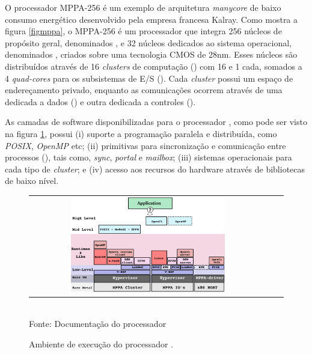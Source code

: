 \documentclass[
	12pt,				%
	openright,			%
	twoside,			%
	a4paper,			%
	english,			%
	brazil,				%
	]{abntex2}
\begin{document}
        O processador MPPA-256 é um exemplo de arquitetura \textit{manycore}
        de baixo consumo energético \cite{Castro-IA3:2013} desenvolvido pela
        empresa francesa Kalray. Como mostra a figura \ref{figmppa}, o MPPA-256
        é um processador que integra 256 núcleos de propósito geral,
        denominados \pe, e 32 núcleos dedicados ao sistema operacional,
        denominados \rman, criados sobre uma tecnologia CMOS de 28nm.
        Esses núcleos são distribuídos através de 16 \textit{clusters} de
        computação (\cpclusters) com 16 \pes e 1 \rman cada, somados a 
        4 \textit{quad-cores} para os subsistemas de E/S (\ioclusters).
        Cada \textit{cluster} possui um espaço de endereçamento privado,
        enquanto as comunicações ocorrem através de uma \noc dedicada a
        dados (\dnoc) e outra dedicada a controles (\cnoc).
            
        As camadas de software disponibilizadas para o processador \mppa,
        como pode ser visto na figura \ref{figruntime}, possui
        (i) suporte a programação paralela e distribuída, como
        \textit{POSIX}, \textit{OpenMP} etc;
        (ii) primitivas para sincronização e comunicação entre processos
        (\ipc), tais como, \textit{sync}, \textit{portal} e \textit{mailbox};
        (iii) sistemas operacionais para cada tipo de \textit{cluster}; e
        (iv) acesso aos recursos do hardware através de bibliotecas de baixo nível.
    
        \begin{figure}[t]
        	\begin{center}
            	\caption{Ambiente de execução do processador \mppa.}
                   \label{figruntime}
        		\begin{tabular}{ccc}
        			\includegraphics[width=0.67\textwidth]{figs/software_stack.png} \\
        		\end{tabular}
                \vspace{1ex} \\
                Fonte: Documentação do processador \mppa
            \end{center}
           \vspace{-2ex}
        \end{figure}
        
\end{document}
